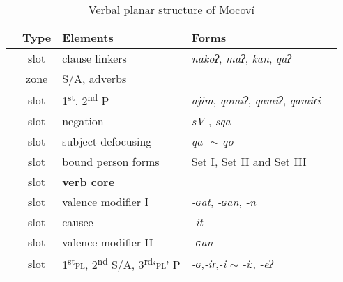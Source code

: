 \documentclass[output=paper]{langscibook}
\begin{document}
\begin{table}
    \caption{Verbal planar structure of Mocoví}
    \label{tab:verbplanar}
\begin{tabular}{Sclll} \lsptoprule
	    & Type  & Elements  & Forms \\ \midrule
	\label{linkers} & slot &  clause linkers & \textit{nakoʔ}, \textit{maʔ}, \textit{kan}, \textit{qaʔ} \\
\label{sapadv}                & zone          & S/A, adverbs                    &  \\

\label{p}           & slot          & 1\textsuperscript{st}, 2\textsuperscript{nd} P             & \textit{ajim}, \textit{qomiʔ}, \textit{qamiʔ}, \textit{qamiɾi} \\

\label{moc:neg}                & slot          & negation           & \textit{sV-}, \textit{sqa-}                  \\

\label{sdef}               & slot         & subject defocusing  & \textit{qa-} $\sim$ \textit{qo-}             \\


\label{sap}                & slot          & bound person forms  & Set I,  Set II and Set III \\

\textbf{\label{moc:core}}       & slot          & \textbf{verb core}       &    \\ 

\label{vmI}               & slot          & valence modifier I     & \textit{-ɢat}, \textit{-ɢan}, \textit{-n} \\

\label{causee}               & slot      & causee    & \textit{-it}     \\

\label{vmII}              & slot          & valence modifier II    & \textit{-ɢan}     \\ 

\label{2and1pl}              & slot          &  1\textsuperscript{st}\textsc{pl}, 2\textsuperscript{nd} S/A, 3\textsuperscript{rd}\textsc{`pl'} P    & \textit{-ɢ},\textit{-iɾ},\textit{-i} $\sim$ \textit{-iː}, \textit{-eʔ}        \\


\end{tabular}
\end{table}
\end{document}
